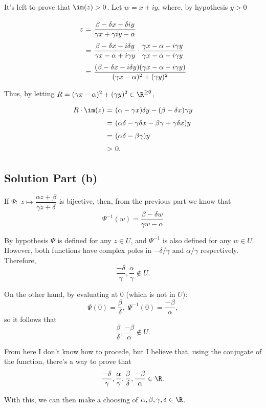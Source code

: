 It's left to prove that $\im(z) > 0$. Let $w = x+iy$, where, by hypothesis $y > 0$
\[ \everymath{\displaystyle}
\arraycolsep=1.8pt\def\arraystretch{2.5}
\begin{array}{rcl}
    z & = & \frac{\beta - \delta x - \delta i y}{\gamma x + \gamma i y - \alpha}\\
    & = & \frac{\beta - \delta x - i \delta  y}{\gamma x - \alpha + i \gamma y} \cdot \frac{\gamma x - \alpha - i \gamma y}{\gamma x - \alpha - i \gamma y}\\
    & = & \frac{(\beta - \delta x - i \delta  y)(\gamma x - \alpha - i \gamma y)}{(\gamma x - \alpha)^2 + (\gamma y)^2 }
\end{array} \]

Thus, by letting $R = (\gamma x - \alpha)^2 + (\gamma y)^2 \in \R^{\geq 0}$,
\[ \everymath{\displaystyle}
\arraycolsep=1.8pt\def\arraystretch{1.5}
\begin{array}{rcl}
    R \cdot \im(z) & = & (\alpha - \gamma x)\delta y - (\beta - \delta x)\gamma y\\
    & = & (\alpha\delta - \gamma \delta x - \beta \gamma + \gamma \delta x) y\\
    & = & (\alpha\delta - \beta \gamma) y\\
    & > & 0. 
\end{array} \]


\subsection*{Solution Part (b)}

If $\Psi: \; z \mapsto \dfrac{\alpha z + \beta}{\gamma z + \delta}$ is bijective, then, from the previous part we know that
\[ \Psi^{-1}(w) = \frac{\beta - \delta w}{\gamma w - \alpha} \]

By hypothesis $\Psi$ is defined for any $z \in U$, and $\Psi^{-1}$ is also defined for any $w \in U$. However, both functions have complex poles in $-\delta/\gamma$ and $\alpha/\gamma$ respectively. Therefore,
\[ \frac{-\delta}{\gamma}, \frac{\alpha}{\gamma} \not\in U.\]

On the other hand, by evaluating at 0 (which is not in $U$):
\[ \Psi(0) = \frac{\beta}{\delta},\; \Psi^{-1}(0) = \frac{-\beta}{\alpha}, \]
so it follows that
\[ \frac{\beta}{\delta}, \frac{-\beta}{\alpha} \not\in U. \]

From here I don't know how to procede, but I believe that, using the conjugate of the function, there's a way to prove that 
\[ \frac{-\delta}{\gamma}, \frac{\alpha}{\gamma}, \frac{\beta}{\delta}, \frac{-\beta}{\alpha} \in \R. \]

With this, we can then make a choosing of $\alpha,\beta,\gamma,\delta \in \R$.

